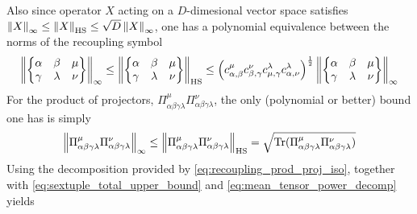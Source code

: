 \documentclass[notitlepage, 10pt]{article}
\begin{document}
Also since operator $X$ acting on a $D$-dimesional vector space satisfies $\left\lVert X\right\rVert_{\infty} \leq \left\lVert X\right\rVert_{\mathrm{HS}} \leq \sqrt{D}\left\lVert X\right\rVert_{\infty}$, one has a polynomial equivalence between the norms of the recoupling symbol
\begin{equation}
    \left\lVert\begin{Bmatrix}\alpha & \beta & \mu \\ \gamma & \lambda & \nu \end{Bmatrix}\right\rVert_{\infty}
    \leq \left\lVert\begin{Bmatrix}\alpha & \beta & \mu \\ \gamma & \lambda & \nu \end{Bmatrix}\right\rVert_{\mathrm{HS}}
    \leq \left(c_{\alpha,\beta}^{\mu}c_{\beta,\gamma}^{\nu}c_{\mu,\gamma}^{\lambda}c_{\alpha,\nu}^{\lambda}\right)^{\frac{1}{2}}\left\lVert\begin{Bmatrix}\alpha & \beta & \mu \\ \gamma & \lambda & \nu \end{Bmatrix}\right\rVert_{\infty}
\end{equation}
For the product of projectors, $\Pi_{\alpha\beta\gamma\lambda}^{\mu}\Pi_{\alpha\beta\gamma\lambda}^{\nu}$, the only (polynomial or better) bound one has is simply
\begin{equation}
    \left\lVert\Pi_{\alpha\beta\gamma\lambda}^{\mu}\Pi_{\alpha\beta\gamma\lambda}^{\nu}\right\rVert_{\infty} 
    \leq 
    \left\lVert\Pi_{\alpha\beta\gamma\lambda}^{\mu}\Pi_{\alpha\beta\gamma\lambda}^{\nu}\right\rVert_{\mathrm{HS}} 
    = \sqrt{ \operatorname{Tr}(\Pi_{\alpha\beta\gamma\lambda}^{\mu}\Pi_{\alpha\beta\gamma\lambda}^{\nu})}
\end{equation}
Using the decomposition provided by \cref{eq:recoupling_prod_proj_iso}, together with \cref{eq:sextuple_total_upper_bound} and \cref{eq:mean_tensor_power_decomp} yields
\end{document}
